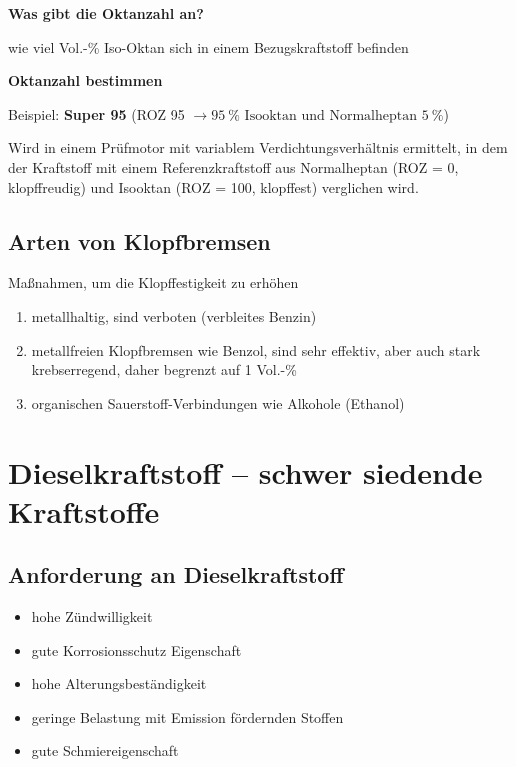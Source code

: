 \textbf{Was gibt die Oktanzahl an?}

wie viel Vol.-\% Iso-Oktan sich in einem Bezugskraftstoff befinden

\textbf{Oktanzahl bestimmen}

Beispiel: \textbf{Super 95} (ROZ 95
$\to 95~\% \text{ Isooktan und Normalheptan } 5~\%$)

Wird in einem Prüfmotor mit variablem Verdichtungsverhältnis ermittelt,
in dem der Kraftstoff mit einem Referenzkraftstoff aus Normalheptan (ROZ
= 0, klopffreudig) und Isooktan (ROZ = 100, klopffest) verglichen wird.

\subsection{Arten von Klopfbremsen}\label{arten-von-klopfbremsen}

Maßnahmen, um die Klopffestigkeit zu erhöhen

\begin{enumerate}
\item
  metallhaltig, sind verboten (verbleites Benzin)
\item
  metallfreien Klopfbremsen wie Benzol, sind sehr effektiv, aber auch
  stark krebserregend, daher begrenzt auf 1 Vol.-\%
\item
  organischen Sauerstoff-Verbindungen wie Alkohole (Ethanol)
\end{enumerate}

\section{Dieselkraftstoff -- schwer siedende
Kraftstoffe}\label{dieselkraftstoff-schwer-siedende-kraftstoffe}

\subsection{Anforderung an
Dieselkraftstoff}\label{anforderung-an-dieselkraftstoff}

\begin{itemize}
\item
  hohe Zündwilligkeit
\item
  gute Korrosionsschutz Eigenschaft
\item
  hohe Alterungsbeständigkeit
\item
  geringe Belastung mit Emission fördernden Stoffen
\item
  gute Schmiereigenschaft
\end{itemize}

